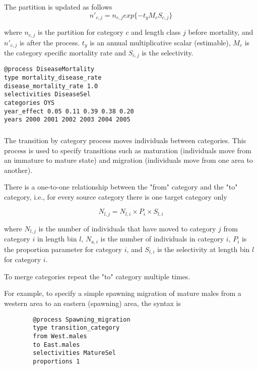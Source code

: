 The partition is updated as follows
\begin{equation}
	n'_{c,j} = n_{c,j}  exp\{-t_y M_{c} S_{c,j} \}
\end{equation}

where \(n_{c,j}\) is the partition for category \(c\) and length class \(j\) before mortality, and \(n'_{c,j}\)  is after the process. \(t_y\) is an annual multiplicative scalar (estimable), \(M_{c}\) is the category specific mortality rate and \(S_{c,j}\) is the selectivity.
 
{\small{\begin{verbatim}
@process DiseaseMortality
type mortality_disease_rate
disease_mortality_rate 1.0
selectivities DiseaseSel 
categories OYS
year_effect 0.05 0.11 0.39 0.38 0.20 
years 2000 2001 2002 2003 2004 2005 
		\end{verbatim}}}

\subsubsection{}\label{sec:Process-Length-TransitionCategory}

The transition by category process moves individuals between categories. This process is used to specify transitions such as maturation (individuals move from an immature to mature state) and migration (individuals move from one area to another).

There is a one-to-one relationship between the "from" category and the "to" category, i.e., for every source category there is one target category only

\begin{equation}
N_{l,j} = N_{l,i} \times P_i \times S_{l,i}
\end{equation}

where $N_{l,j}$ is the number of individuals that have moved to category $j$ from category $i$ in length bin $l$, $N_{a,i}$ is the number of individuals in category $i$, $P_i$ is the proportion parameter for category $i$, and $S_{l,i}$ is the selectivity at length bin $l$ for category $i$.

To merge categories repeat the "to" category multiple times.

For example, to specify a simple spawning migration of mature males from a western area to an eastern (spawning) area, the syntax is

{\small{\begin{verbatim}
		@process Spawning_migration
		type transition_category
		from West.males
		to East.males
		selectivities MatureSel
		proportions 1
		\end{verbatim}}}

